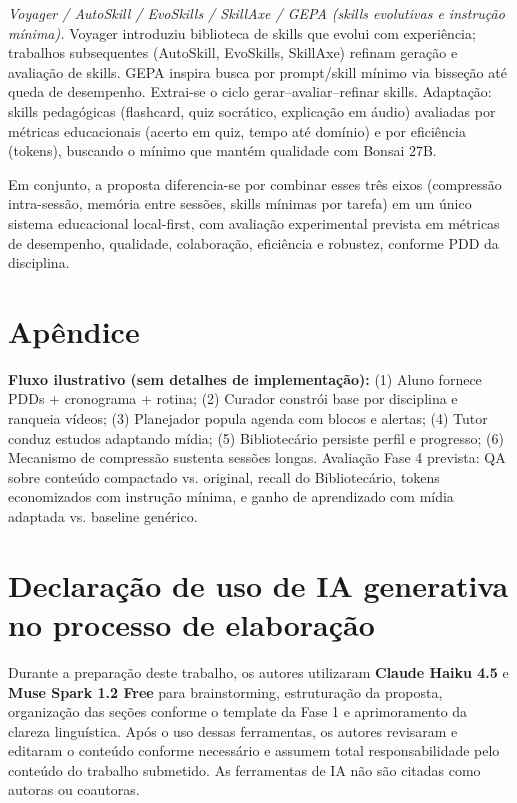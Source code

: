\documentclass[12pt]{article}
\begin{document}
\textit{Voyager / AutoSkill / EvoSkills / SkillAxe / GEPA (skills evolutivas e instrução mínima).} Voyager introduziu biblioteca de skills que evolui com experiência; trabalhos subsequentes (AutoSkill, EvoSkills, SkillAxe) refinam geração e avaliação de skills. GEPA inspira busca por prompt/skill mínimo via bisseção até queda de desempenho. Extrai-se o ciclo gerar--avaliar--refinar skills. Adaptação: skills pedagógicas (flashcard, quiz socrático, explicação em áudio) avaliadas por métricas educacionais (acerto em quiz, tempo até domínio) e por eficiência (tokens), buscando o mínimo que mantém qualidade com Bonsai 27B.

Em conjunto, a proposta diferencia-se por combinar esses três eixos (compressão intra-sessão, memória entre sessões, skills mínimas por tarefa) em um único sistema educacional local-first, com avaliação experimental prevista em métricas de desempenho, qualidade, colaboração, eficiência e robustez, conforme PDD da disciplina.

\section*{Apêndice}
\label{sec:apendice}

\textbf{Fluxo ilustrativo (sem detalhes de implementação):} (1) Aluno fornece PDDs + cronograma + rotina; (2) Curador constrói base por disciplina e ranqueia vídeos; (3) Planejador popula agenda com blocos e alertas; (4) Tutor conduz estudos adaptando mídia; (5) Bibliotecário persiste perfil e progresso; (6) Mecanismo de compressão sustenta sessões longas. Avaliação Fase 4 prevista: QA sobre conteúdo compactado vs. original, recall do Bibliotecário, tokens economizados com instrução mínima, e ganho de aprendizado com mídia adaptada vs. baseline genérico.

\section*{Declaração de uso de IA generativa no processo de elaboração}

Durante a preparação deste trabalho, os autores utilizaram \textbf{Claude Haiku 4.5} e \textbf{Muse Spark 1.2 Free} para brainstorming, estruturação da proposta, organização das seções conforme o template da Fase 1 e aprimoramento da clareza linguística. Após o uso dessas ferramentas, os autores revisaram e editaram o conteúdo conforme necessário e assumem total responsabilidade pelo conteúdo do trabalho submetido. As ferramentas de IA não são citadas como autoras ou coautoras.

\newpage

{}
\end{document}
